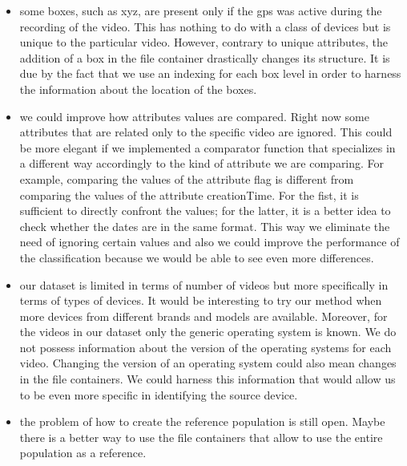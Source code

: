 \begin{itemize}
\item some boxes, such as xyz, are present only if the gps was active during the recording of the video. This has nothing to do with a class of devices but is unique to the particular video. However, contrary to unique attributes, the addition of a box in the file container drastically changes its structure. It is due by the fact that we use an indexing for each box level in order to harness the information about the location of the boxes.

\item we could improve how attributes values are compared. Right now some attributes that are related only to the specific video are ignored. This could be more elegant if we implemented a comparator function that specializes in a different way accordingly to the kind of attribute we are comparing. For example, comparing the values of the attribute flag is different from comparing the values of the attribute creationTime. For the fist, it is sufficient to directly confront the values; for the latter, it is a better idea to check whether the dates are in the same format. This way we eliminate the need of ignoring certain values and also we could improve the performance of the classification because we would be able to see even more differences.

\item our dataset is limited in terms of number of videos but more specifically in terms of types of devices. It would be interesting to try our method when more devices from different brands and models are available. Moreover, for the videos in our dataset only the generic operating system is known. We do not possess information about the version of the operating systems for each video. Changing the version of an operating system could also mean changes in the file containers. We could harness this information that would allow us to be even more specific in identifying the source device.

\item the problem of how to create the reference population is still open. Maybe there is a better way to use the file containers that allow to use the entire population as a reference.

\end{itemize}

